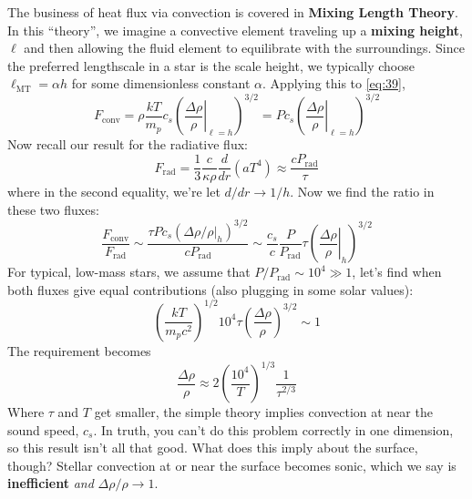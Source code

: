 \documentclass[10pt]{article}
\numberwithin{equation}{section}
\newcommand{\n}{\noindent}
\begin{document}
  \n The business of heat flux via convection is covered in
  \textbf{Mixing Length Theory}. In this ``theory'', we imagine a
  convective element traveling up a \textbf{mixing height}, $\ell$ and
  then allowing the fluid element to equilibrate with the
  surroundings. Since the preferred lengthscale in a star is the scale
  height, we typically choose $\ell_{\mathrm{MT}}=\alpha h$ for some
  dimensionless constant $\alpha$. Applying this to \eqref{eq:39},
  \begin{equation}
    \label{eq:40}
    F_{\mathrm{conv}}=\rho\frac{kT}{m_p}c_s\left(\left.\frac{\Delta\rho}
{\rho}\right|_{\ell=h}\right)^{3/2}=Pc_s\left(\left.\frac{\Delta\rho}{\rho}
\right|_{\ell=h}\right)^{3/2}
  \end{equation}
  Now recall our result for the radiative flux:
  \begin{equation}
    \label{eq:41}
    F_{\mathrm{rad}}=\frac{1}{3}\frac{c}{\kappa\rho}\frac{d}{dr}\left
(aT^4\right)\approx \frac{cP_{\mathrm{rad}}}{\tau}
  \end{equation}
  where in the second equality, we're let $d/dr\to 1/h$. Now we find
  the ratio in these two fluxes:
  \begin{equation}
    \label{eq:42}
    \frac{F_{\mathrm{conv}}}{F_{\mathrm{rad}}}\sim \frac{\tau Pc_s\left
(\left.\Delta\rho/\rho\right|_h\right)^{3/2}}{cP_{\mathrm{rad}}}\sim\frac
{c_s}{c}\frac{P}{P_{\mathrm{rad}}}\tau\left(\left.\frac{\Delta\rho}{\rho}
\right|_h\right)^{3/2}
  \end{equation}
  For typical, low-mass stars, we assume that $P/P_{\mathrm{rad}}\sim 
10^4\gg
  1$, let's find when both fluxes give equal contributions (also
  plugging in some solar values):
  \begin{equation}
    \label{eq:43}
    \left(\frac{kT}{m_pc^2}\right)^{1/2}10^4\tau\left(\frac{\Delta\rho}
{\rho}\right)^{3/2}\sim 1
  \end{equation}
  The requirement becomes
  \begin{equation}
    \label{eq:44}
    \frac{\Delta\rho}{\rho}\approx 2\left(\frac{10^4}{T}\right)^{1/3}\frac
{1}{\tau^{2/3}}
  \end{equation}
  Where $\tau$ and $T$ get smaller, the simple theory implies
  convection at near the sound speed, $c_s$. In truth, you can't do
  this problem correctly in one dimension, so this result isn't all
  that good. What does this imply about the surface, though? Stellar
  convection at or near the surface becomes sonic, which we say is
  \textbf{inefficient} \emph{and} $\Delta\rho/\rho\to 1$.\\
\end{document}
